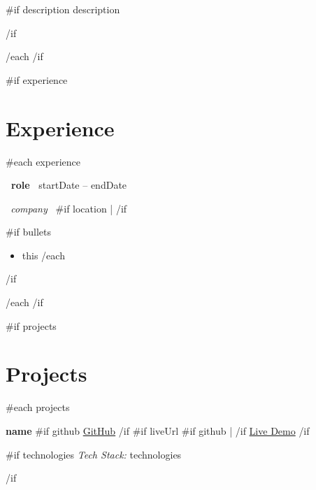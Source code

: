 \documentclass[10pt,a4paper]{article}
\begin{document}
{{#if description}}
\vspace{2pt}
{{description}}
\par
{{/if}}

\vspace{2pt}

{{/each}}
{{/if}}

{{#if experience}}
\section{Experience}

{{#each experience}}

\textbf{ {{~role~}} }
\hfill
{\small\color{muted}
{{startDate}} -- {{endDate}}
}

\par

{\small
\textit{ {{~company~}} }
{{#if location}}
\enspace | 
{{/if}}
}
\par

{{#if bullets}}
\begin{itemize}
    {{#each bullets}}
    \item {{this}}
    {{/each}}
\end{itemize}
{{/if}}

\vspace{3pt}

{{/each}}
{{/if}}

{{#if projects}}
\section{Projects}

{{#each projects}}

\noindent
\textbf{\normalsize {{name}} }
\hfill
{\small
{{#if github}}
\href{ {{~github~}} }{GitHub}
{{/if}}
{{#if liveUrl}}
{{#if github}}
\enspace | \enspace
{{/if}}
\href{ {{~liveUrl~}} }{Live Demo}
{{/if}}
}
\par
\vspace{2pt}

{{#if technologies}}
{\small\color{muted}
\textit{Tech Stack:} {{technologies}}
}
\par
\vspace{3pt}
{{/if}}
\end{document}
